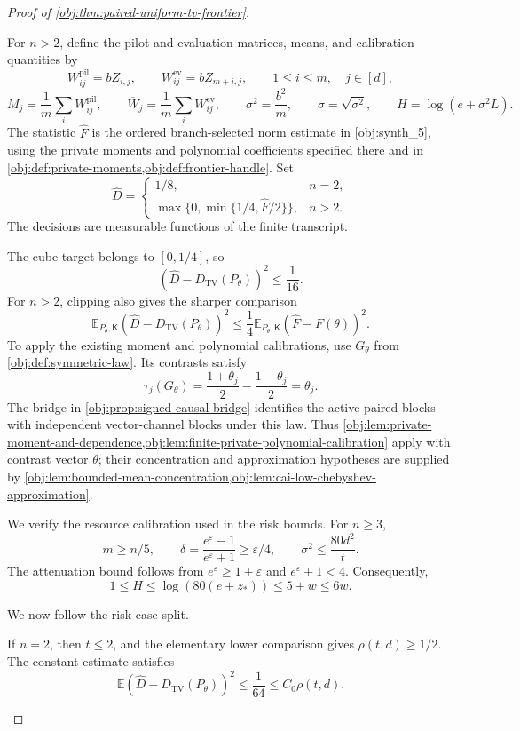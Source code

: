 \documentclass[11pt]{article}
\begin{document}
\begin{proof}[Proof of \cref{obj:thm:paired-uniform-tv-frontier}]
\begin{enumerate}
For \(n>2\), define the pilot and evaluation matrices, means, and calibration quantities by
\[
W^{\mathrm{pil}}_{ij}=bZ_{i,j},\qquad
W^{\mathrm{ev}}_{ij}=bZ_{m+i,j},
\qquad 1\le i\le m,\quad j\in[d],
\]
\[
M_j=\frac1m\sum_iW^{\mathrm{pil}}_{ij},\qquad
\overline W_j=\frac1m\sum_iW^{\mathrm{ev}}_{ij},
\qquad
\sigma^2=\frac{b^2}{m},\qquad \sigma=\sqrt{\sigma^2},
\qquad H=\log(e+\sigma^2L).
\]
The statistic \(\widehat F\) is the ordered branch-selected norm estimate in
\cref{obj:synth_5}, using the private moments and polynomial coefficients specified there and in \cref{obj:def:private-moments,obj:def:frontier-handle}.
Set
\[
\widehat D=
\begin{cases}
1/8,&n=2,\\
\max\{0,\min\{1/4,\widehat F/2\}\},&n>2.
\end{cases}
\]
The decisions are measurable functions of the finite transcript.

The cube target belongs to \([0,1/4]\), so
\[
(\widehat D-D_{\mathrm{TV}}(P_\theta))^2\le\frac1{16}.
\]
For \(n>2\), clipping also gives the sharper comparison
\[
\mathbb E_{P_\theta,\mathsf K}
(\widehat D-D_{\mathrm{TV}}(P_\theta))^2
\le\frac14
\mathbb E_{P_\theta,\mathsf K}(\widehat F-F(\theta))^2.
\]
To apply the existing moment and polynomial calibrations, use \(G_\theta\) from
\cref{obj:def:symmetric-law}. Its contrasts satisfy
\[
\tau_j(G_\theta)
=\frac{1+\theta_j}{2}-\frac{1-\theta_j}{2}
=\theta_j.
\]
The bridge in \cref{obj:prop:signed-causal-bridge} identifies the active paired blocks with independent vector-channel blocks under this law. Thus
\cref{obj:lem:private-moment-and-dependence,obj:lem:finite-private-polynomial-calibration}
apply with contrast vector \(\theta\); their concentration and approximation hypotheses are supplied by
\cref{obj:lem:bounded-mean-concentration,obj:lem:cai-low-chebyshev-approximation}.

We verify the resource calibration used in the risk bounds. For \(n\ge3\),
\[
m\ge n/5,\qquad
\delta=\frac{e^\varepsilon-1}{e^\varepsilon+1}\ge\varepsilon/4,
\qquad
\sigma^2\le\frac{80d^2}{t}.
\]
The attenuation bound follows from \(e^\varepsilon\ge1+\varepsilon\) and
\(e^\varepsilon+1<4\).
Consequently,
\[
1\le H\le\log(80(e+z_*))
\le5+w\le6w.
\]

We now follow the risk case split.

If \(n=2\), then \(t\le2\), and the elementary lower comparison gives
\(\rho(t,d)\ge1/2\). The constant estimate satisfies
\[
\mathbb E(\widehat D-D_{\mathrm{TV}}(P_\theta))^2
\le\frac1{64}\le C_0\rho(t,d).
\]


\end{enumerate}
\end{proof}
\end{document}
